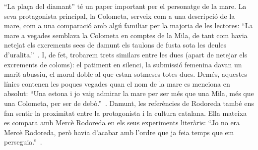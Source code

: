``La plaça del diamant'' té un paper important per el personatge de la mare.
La seva protagonista principal, la Colometa, serveix com a una descripció de la mare, com a una comparació amb algú familiar per la majoria de les lectores:
``La mare a vegades semblava la Colometa en comptes de la Mila, de tant com havia netejat els excrements secs de damunt els taulons de fusta sota les deules d'uralita.''~\autocite[199]{ElHachmi2008}.
I, de fet, trobarem trets similars entre les dues (apart de netejar els excrements de coloms): el patiment en silenci, la submissió femenina davan un marit abussiu, el moral doble al que estan sotmeses totes dues.
Demés, aquestes línies contenen les poques vegades quan el nom de la mare es menciona en absolut:
``Una estona i jo vaig admirar la mare per ser més que una Mila, més que una Colometa, per ser de debò.''~\autocite[223]{ElHachmi2008}.
Damunt, les referències de Rodoreda també ens fan sentir la proximitat entre la protagonista i la cultura catalana.
Ella mateixa es compara amb Mercè Rodoreda en els seus experiments literàris: ``Jo no era Mercè Rodoreda, però havia d'acabar amb l'ordre que ja feia temps que em perseguia.''~\autocite[331]{ElHachmi2008}.

